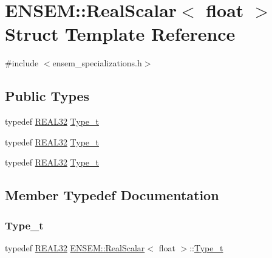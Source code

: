\hypertarget{structENSEM_1_1RealScalar_3_01float_01_4}{}\section{E\+N\+S\+EM\+:\+:Real\+Scalar$<$ float $>$ Struct Template Reference}
\label{structENSEM_1_1RealScalar_3_01float_01_4}


{\ttfamily \#include $<$ensem\+\_\+specializations.\+h$>$}

\subsection*{Public Types}
\begin{DoxyCompactItemize}
\item 
typedef \mbox{\hyperlink{namespaceENSEM_a7540d01191172323e9073283d772576d}{R\+E\+A\+L32}} \mbox{\hyperlink{structENSEM_1_1RealScalar_3_01float_01_4_a897db3180e57c127ea66a260ac1d0bc4}{Type\+\_\+t}}
\item 
typedef \mbox{\hyperlink{namespaceENSEM_a7540d01191172323e9073283d772576d}{R\+E\+A\+L32}} \mbox{\hyperlink{structENSEM_1_1RealScalar_3_01float_01_4_a897db3180e57c127ea66a260ac1d0bc4}{Type\+\_\+t}}
\item 
typedef \mbox{\hyperlink{namespaceENSEM_a7540d01191172323e9073283d772576d}{R\+E\+A\+L32}} \mbox{\hyperlink{structENSEM_1_1RealScalar_3_01float_01_4_a897db3180e57c127ea66a260ac1d0bc4}{Type\+\_\+t}}
\end{DoxyCompactItemize}


\subsection{Member Typedef Documentation}
\mbox{\label{structENSEM_1_1RealScalar_3_01float_01_4_a897db3180e57c127ea66a260ac1d0bc4}} 
\subsubsection{\texorpdfstring{Type\_t}{Type\_t}\hspace{0.1cm}{\footnotesize\ttfamily [1/3]}}
{\footnotesize\ttfamily typedef \mbox{\hyperlink{namespaceENSEM_a7540d01191172323e9073283d772576d}{R\+E\+A\+L32}} \mbox{\hyperlink{structENSEM_1_1RealScalar}{E\+N\+S\+E\+M\+::\+Real\+Scalar}}$<$ float $>$\+::\mbox{\hyperlink{structENSEM_1_1RealScalar_3_01float_01_4_a897db3180e57c127ea66a260ac1d0bc4}{Type\+\_\+t}}}

